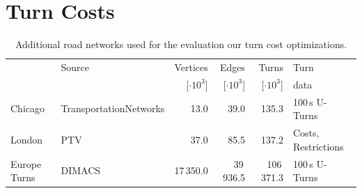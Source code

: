 \documentclass[a4paper, english, cleveref]{lipics-v2021}
\begin{document}
\section{Turn Costs}
\begin{table}
\centering
\caption{
Additional road networks used for the evaluation our turn cost optimizations.
}\label{tab:add_turn_graphs}
\begin{tabular}{llrrrl}
\toprule
           & Source                 &       Vertices &          Edges &          Turns & Turn           \\
           &                        & [$\cdot 10^3$] & [$\cdot 10^3$] & [$\cdot 10^3$] & data           \\
\midrule
Chicago    & TransportationNetworks &           13.0 &           39.0 &          135.3 & 100\,s U-Turns \\
London     & PTV                    &           37.0 &           85.5 &          137.2 & Costs, Restrictions \\
Europe Turns & DIMACS               &      17\,350.0 &      39\,936.5 &     106\,371.3 & 100\,s U-Turns \\
\bottomrule
\end{tabular}
\end{table}
\end{document}
